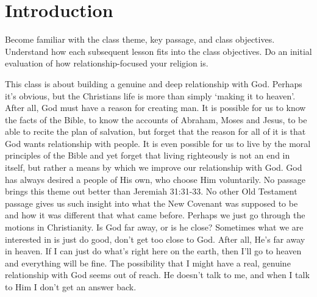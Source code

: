 \chapter{Introduction}

\begin{goals}
\goal Become familiar with the class theme, key passage, and class objectives.
\goal Understand how each subsequent lesson fits into the class objectives.
\goal Do an initial evaluation of how relationship-focused your religion is.
\end{goals}

\begin{intro}
This class is about building a genuine and deep relationship with God.  Perhaps it's obvious, but the Christians life is more than simply `making it to heaven'.  After all, God must have a reason for creating man.  It is possible for us to know the facts of the Bible, to know the accounts of Abraham, Moses and Jesus, to be able to recite the plan of salvation, but forget that the reason for all of it is that God wants relationship with people.  It is even possible for us to live by the moral principles of the Bible and yet forget that living righteously is not an end in itself, but rather a means by which we improve our relationship with God.  God has always desired a people of His own, who choose Him voluntarily.  No passage brings this theme out better than Jeremiah 31:31-33.  No other Old Testament passage gives us such insight into what the New Covenant was supposed to be and how it was different that what came before.  Perhaps we just go through the motions in Christianity.  Is God far away, or is he close?  Sometimes what we are interested in is just do good, don't get too close to God.  After all, He's far away in heaven.  If I can just do what's right here on the earth, then I'll go to heaven and everything will be fine.  The possibility that I might have a real, genuine relationship with God seems out of reach.  He doesn't talk to me, and when I talk to Him I don't get an answer back.  
\end{intro}


